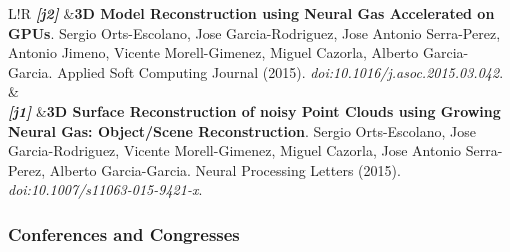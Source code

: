 \documentclass[8pt]{article}
\newcommand\VRule{\color{lightgray}\vrule width 0.5pt}
\begin{document}
\begin{tabular}{L!{\VRule}R}
	\emph{\textbf{[j2]}} &\textbf{3D Model Reconstruction using Neural Gas Accelerated on GPUs}. Sergio Orts-Escolano, Jose Garcia-Rodriguez, Jose Antonio Serra-Perez, Antonio Jimeno, Vicente Morell-Gimenez, Miguel Cazorla, Alberto Garcia-Garcia. Applied Soft Computing Journal (2015). \emph{doi:10.1016/j.asoc.2015.03.042}.\\
	& \\
	\emph{\textbf{[j1]}} &\textbf{3D Surface Reconstruction of noisy Point Clouds using Growing Neural Gas: Object/Scene Reconstruction}. Sergio Orts-Escolano, Jose Garcia-Rodriguez, Vicente Morell-Gimenez, Miguel Cazorla, Jose Antonio Serra-Perez, Alberto Garcia-Garcia. Neural Processing Letters (2015). \emph{doi:10.1007/s11063-015-9421-x}. \\
\end{tabular}

\subsubsection*{Conferences and Congresses}
\end{document}

